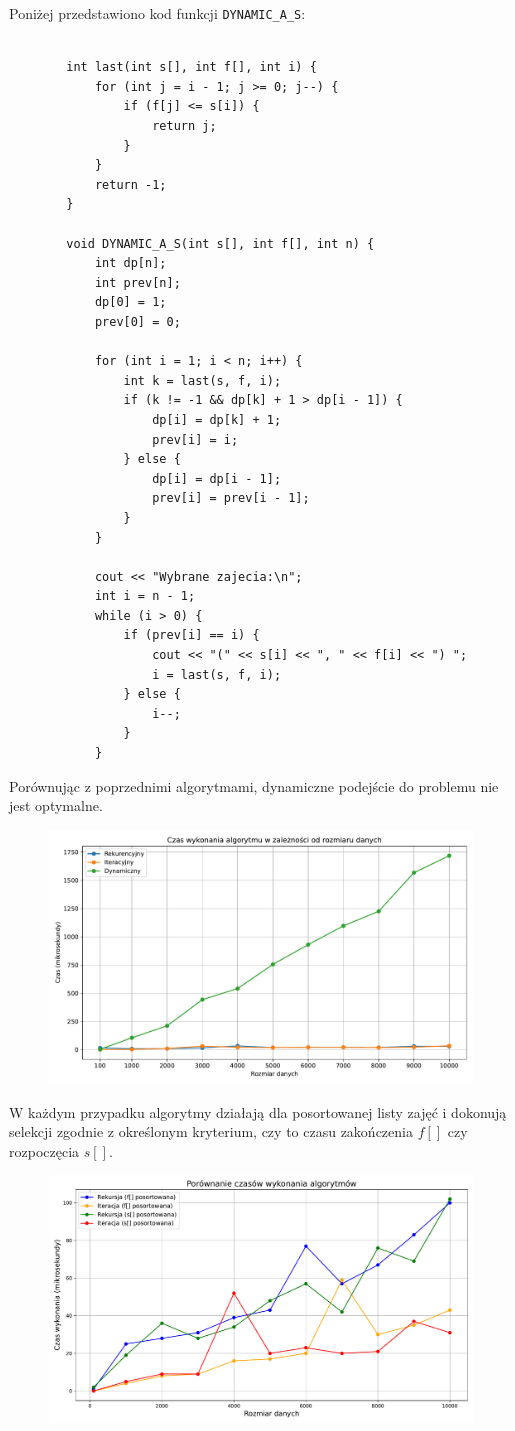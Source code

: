 \documentclass{article}
\begin{document}
	Poniżej przedstawiono kod funkcji \texttt{DYNAMIC\_A\_S}:
	\begin{lstlisting}
	
		int last(int s[], int f[], int i) {
			for (int j = i - 1; j >= 0; j--) {
				if (f[j] <= s[i]) {
					return j;
				}
			}
			return -1;
		}
		
		void DYNAMIC_A_S(int s[], int f[], int n) {
			int dp[n];
			int prev[n];
			dp[0] = 1;
			prev[0] = 0;
			
			for (int i = 1; i < n; i++) {
				int k = last(s, f, i);
				if (k != -1 && dp[k] + 1 > dp[i - 1]) {
					dp[i] = dp[k] + 1;
					prev[i] = i;
				} else {
					dp[i] = dp[i - 1];
					prev[i] = prev[i - 1];
				}
			}
			
			cout << "Wybrane zajecia:\n";
			int i = n - 1;
			while (i > 0) {
				if (prev[i] == i) {
					cout << "(" << s[i] << ", " << f[i] << ") ";
					i = last(s, f, i);
				} else {
					i--;
				}
			}
	\end{lstlisting}
	Porównując z poprzednimi algorytmami, dynamiczne podejście do problemu nie jest optymalne.
		\begin{figure}[H]
		\centering
		\includegraphics[width=1\textwidth]{wykres8.pdf}
	\end{figure}
	W każdym przypadku algorytmy działają dla posortowanej listy zajęć i dokonują selekcji zgodnie z określonym kryterium, czy to czasu zakończenia \(f[]\) czy rozpoczęcia \(s[]\).
		\begin{figure}[H]
		\centering
		\includegraphics[width=1\textwidth]{wykres7.pdf}
	\end{figure}
	
\end{document}
